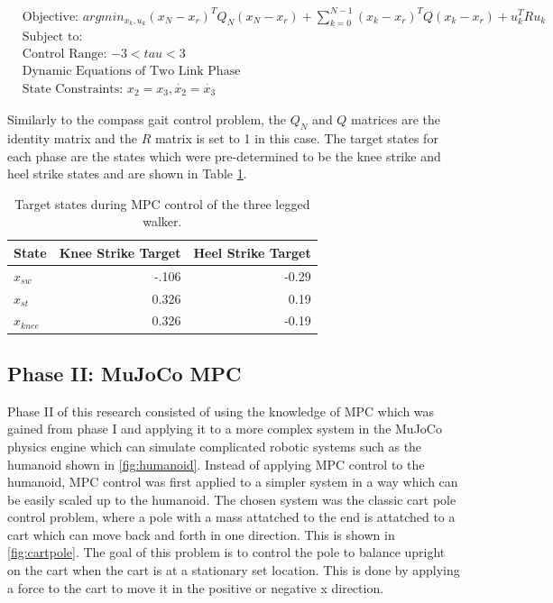 \documentclass{./springer/svjour3}
\begin{document}
\begin{equation}
  \begin{aligned}
  &\text{Objective: $arg min_{x_k,u_k} (x_N - x_r)^TQ_N(x_N - x_r) + \sum_{k = 0}^{N-1} (x_k - x_r)^TQ(x_k - x_r) + u_k^TRu_k $}\\
  &\text{Subject to:}\\
  &\text{Control Range: $-3 < tau < 3$}\\
  &\text{Dynamic Equations of Two Link Phase}\\
  &\text{State Constraints: $x_2 = x_3, \dot{x_2} = \dot{x_3}$}
  \end{aligned}
  \label{eq:twolinkphaseopt}
\end{equation}

Similarly to the compass gait control problem, the $Q_N$ and $Q$ matrices are the identity matrix and the $R$ matrix is set to 1 in this case.
The target states for each phase are the states which were pre-determined to be the knee strike and heel strike states and are shown in Table \ref{tab:threelegterm}.

\begin{table}[h]
  \centering
  \caption{Target states during MPC control of the three legged walker.}
  \begin{tabular}{lrr}
  \toprule
  State & Knee Strike Target & Heel Strike Target\\
  \midrule
  $x_{sw}$ & -.106  & -0.29\\
  $x_{st}$ & 0.326 & 0.19\\
  $x_{knee}$ & 0.326 & -0.19\\
  \end{tabular}
  \label{tab:threelegterm}
\end{table}

\subsection{Phase II: MuJoCo MPC}
Phase II of this research consisted of using the knowledge of MPC which was gained from phase I and applying it to a more complex system in the MuJoCo physics engine which can 
simulate complicated robotic systems such as the humanoid shown in \ref{fig:humanoid}. Instead of applying MPC control to the humanoid, MPC control was first applied to a simpler system 
in a way which can be easily scaled up to the humanoid. The chosen system was the classic cart pole control problem, where a pole with a 
mass attatched to the end is attatched to a cart which can move back and forth in one direction. This is shown in \ref{fig:cartpole}. The goal of this problem is to 
control the pole to balance upright on the cart when the cart is at a stationary set location. This is done by applying a force to the cart to move it in the positive or 
negative x direction.
\end{document}
